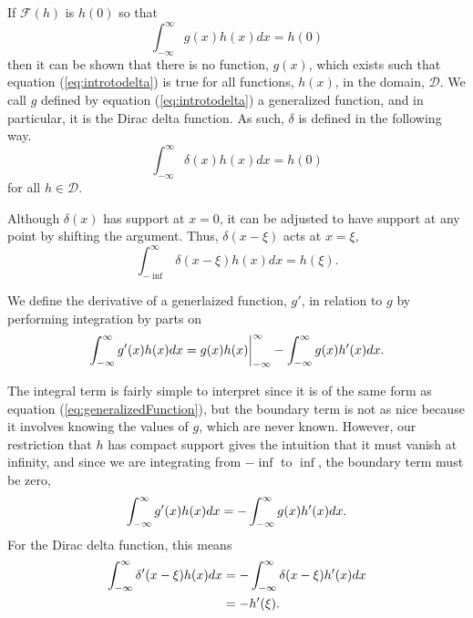 If \(\mathcal{F}(h)\) is \(h(0)\) so that
\begin{equation}\label{eq:introtodelta}
    \int_{-\infty}^{\infty}g(x)h(x) dx=h(0)
\end{equation}
then it can be shown that there is no function, \(g(x)\), which exists such that equation (\ref{eq:introtodelta}) is true for all functions, \(h(x)\), in the domain, \(\mathcal{D}\). We call \(g\) defined by equation (\ref{eq:introtodelta}) a generalized function, and in particular, it is the Dirac delta function. As such, \(\delta\) is defined in the following way.
\begin{equation}\label{eq:deltadef}
    \int_{-\infty}^{\infty} \delta(x)h(x) dx = h(0)
\end{equation}
for all \(h\in \mathcal{D}\).

Although \(\delta(x)\) has support at \(x=0\), it can be adjusted to have support at any point by shifting the argument. Thus, \(\delta(x-\xi)\) acts at \(x=\xi\),
\begin{equation}
    \int_{-\inf}^{\infty} \delta(x-\xi)h(x)dx = h(\xi).
\end{equation}

\begin{definition}
    We define the derivative of a generlaized function, \(g'\), in relation to \(g\) by performing integration by parts on
    \begin{equation}
            \int_{-\infty}^{\infty} g'(x)h(x) dx= g(x)h(x)\biggr\rvert_{-\infty}^{\infty} - \int_{-\infty}^{\infty} g(x)h'(x)dx.
    \end{equation}
\end{definition}
The integral term is fairly simple to interpret since it is of the same form as equation (\ref{eq:generalizedFunction}), but the boundary term is not as nice because it involves knowing the values of \(g\), which are never known. However, our restriction that \(h\) has compact support gives the intuition that it must vanish at infinity, and since we are integrating from \(-\inf\) to \(\inf\), the boundary term must be zero,
\begin{equation}
    \int_{-\infty}^{\infty} g'(x)h(x)dx = -\int_{-\infty}^{\infty} g(x)h'(x)dx.
\end{equation}
For the Dirac delta function, this means
\begin{equation}
    \begin{split} \label{eq:deltafirst}
        \int_{-\infty}^{\infty} \delta'(x-\xi)h(x)dx &= -\int_{-\infty}^{\infty}\delta(x-\xi)h'(x)dx\\
        &=-h'(\xi).
    \end{split}
\end{equation}


